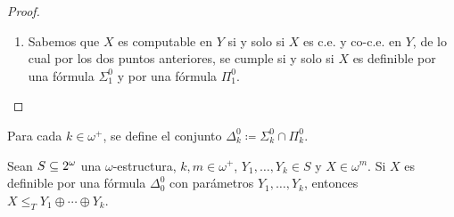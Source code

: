 \begin{proof}
\begin{enumerate}
		Ahora, supongamos que $X$ es co-c.e. en $Y$ para la necesidad. Como $X$ es co-c.e. en $Y$, entonces $\omega\setminus X$ es c.e. en $Y$. Debido al punto anterior sabemos que existe una fórmula $\varphi\in\Sigma_{1}^{0}$ con parámetro $Y$ que define a $\omega\setminus X$. Como $\varphi\in\Sigma_{1}^{0}$, entonces existen $\psi\in\Delta_{0}^{0}$ con parámetro $Y$ y $m\in\VARIABLES[N]$ tales que $\varphi\equiv\exists m\psi$. Se tiene entonces que:
		\[
			X =\omega\setminus\pa*{\omega\setminus X} =\set*{n:\neg\varphi} =\set*{n:\neg\exists m\psi} =\set*{n:\forall m\neg\psi}
		\]
		Ya que $\psi\in\Delta_{0}^{0}$, entonces $\neg\psi\in\Delta_{0}^{0}$, de lo cual se tiene que $\forall m\neg\psi\in\Pi_{1}^{0}$. Por lo tanto, se obtiene que $X$ es definible por una fórmula $\Pi_{1}^{0}$ con parámetro $Y$.
		\item Sabemos que $X$ es computable en $Y$ si y solo si $X$ es c.e. y co-c.e. en $Y$, de lo cual por los dos puntos anteriores, se cumple si y solo si $X$ es definible por una fórmula $\Sigma_{1}^{0}$ y por una fórmula $\Pi_{1}^{0}$.
	\end{enumerate}
\end{proof}

\begin{definition}
	Para cada $k\in\omega^{+}$, se define el conjunto $\Delta_{k}^{0}\coloneqq\Sigma_{k}^{0}\cap\Pi_{k}^{0}$.
\end{definition}

\begin{lemma}
	\label{lemma: delta0_implica_computable_yunta}
	Sean $S\subseteq2^{\omega}$ una $\omega$-estructura, $k, m\in\omega^{+}$, $Y_{1},\dotsc, Y_{k}\in S$ y $X\in\omega^{m}$. Si $X$ es definible por una fórmula $\Delta_{0}^{0}$ con parámetros $Y_{1},\dotsc, Y_{k}$, entonces $X\leq_{T} Y_{1}\oplus\dotsb\oplus Y_{k}$.
\end{lemma}

